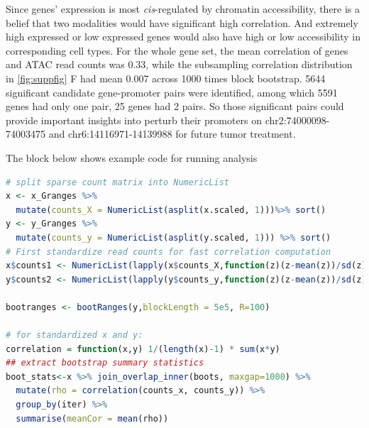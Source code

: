 \documentclass{article}
\begin{document}
Since genes' expression is most \textit{cis}-regulated by chromatin accessibility, there is a belief that two modalities would have significant high correlation. And extremely high expressed or low expressed genes would also have high or low accessibility in corresponding cell types. For the whole gene set, the mean correlation of genes and ATAC read counts was 0.33, while the subsampling correlation distribution in \cref{fig:suppfig} F had mean 0.007 across 1000 times block bootstrap. 5644 significant candidate
gene-promoter pairs were identified, among which 5591 genes had only
one pair, 25 genes had 2 pairs. 
So those significant pairs could provide important insights into perturb their promoters on chr2:74000098-74003475 and chr6:14116971-14139988 for future tumor treatment. 

The block below shows example code for running analysis
\begin{lstlisting}[language=R]
# split sparse count matrix into NumericList
x <- x_Granges %>%
  mutate(counts_X = NumericList(asplit(x.scaled, 1)))%>% sort()
y <- y_Granges %>%
  mutate(counts_y = NumericList(asplit(y.scaled, 1))) %>% sort()
# First standardize read counts for fast correlation computation
x$counts1 <- NumericList(lapply(x$counts_X,function(z)(z-mean(z))/sd(z)))
y$counts2 <- NumericList(lapply(y$counts_y,function(z)(z-mean(z))/sd(z)))

bootranges <- bootRanges(y,blockLength = 5e5, R=100)
  
# for standardized x and y:
correlation = function(x,y) 1/(length(x)-1) * sum(x*y)
## extract bootstrap summary statistics
boot_stats<-x %>% join_overlap_inner(boots, maxgap=1000) %>%
  mutate(rho = correlation(counts_x, counts_y)) %>%
  group_by(iter) %>%
  summarise(meanCor = mean(rho)) 
\end{lstlisting} 
 
\end{document}
